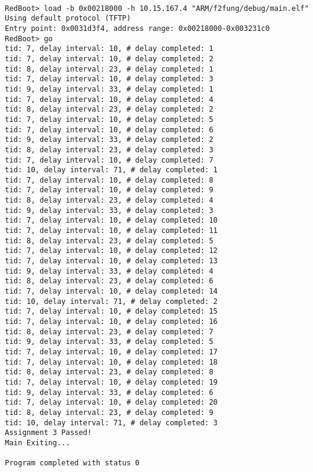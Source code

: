\documentclass[letterpaper]{article}
\begin{document}
\begin{verbatim}

RedBoot> load -b 0x00218000 -h 10.15.167.4 "ARM/f2fung/debug/main.elf"
Using default protocol (TFTP)
Entry point: 0x0031d3f4, address range: 0x00218000-0x003231c0
RedBoot> go
tid: 7, delay interval: 10, # delay completed: 1
tid: 7, delay interval: 10, # delay completed: 2
tid: 8, delay interval: 23, # delay completed: 1
tid: 7, delay interval: 10, # delay completed: 3
tid: 9, delay interval: 33, # delay completed: 1
tid: 7, delay interval: 10, # delay completed: 4
tid: 8, delay interval: 23, # delay completed: 2
tid: 7, delay interval: 10, # delay completed: 5
tid: 7, delay interval: 10, # delay completed: 6
tid: 9, delay interval: 33, # delay completed: 2
tid: 8, delay interval: 23, # delay completed: 3
tid: 7, delay interval: 10, # delay completed: 7
tid: 10, delay interval: 71, # delay completed: 1
tid: 7, delay interval: 10, # delay completed: 8
tid: 7, delay interval: 10, # delay completed: 9
tid: 8, delay interval: 23, # delay completed: 4
tid: 9, delay interval: 33, # delay completed: 3
tid: 7, delay interval: 10, # delay completed: 10
tid: 7, delay interval: 10, # delay completed: 11
tid: 8, delay interval: 23, # delay completed: 5
tid: 7, delay interval: 10, # delay completed: 12
tid: 7, delay interval: 10, # delay completed: 13
tid: 9, delay interval: 33, # delay completed: 4
tid: 8, delay interval: 23, # delay completed: 6
tid: 7, delay interval: 10, # delay completed: 14
tid: 10, delay interval: 71, # delay completed: 2
tid: 7, delay interval: 10, # delay completed: 15
tid: 7, delay interval: 10, # delay completed: 16
tid: 8, delay interval: 23, # delay completed: 7
tid: 9, delay interval: 33, # delay completed: 5
tid: 7, delay interval: 10, # delay completed: 17
tid: 7, delay interval: 10, # delay completed: 18
tid: 8, delay interval: 23, # delay completed: 8
tid: 7, delay interval: 10, # delay completed: 19
tid: 9, delay interval: 33, # delay completed: 6
tid: 7, delay interval: 10, # delay completed: 20
tid: 8, delay interval: 23, # delay completed: 9
tid: 10, delay interval: 71, # delay completed: 3
Assignment 3 Passed!
Main Exiting...

Program completed with status 0

\end{verbatim}
\end{document}
